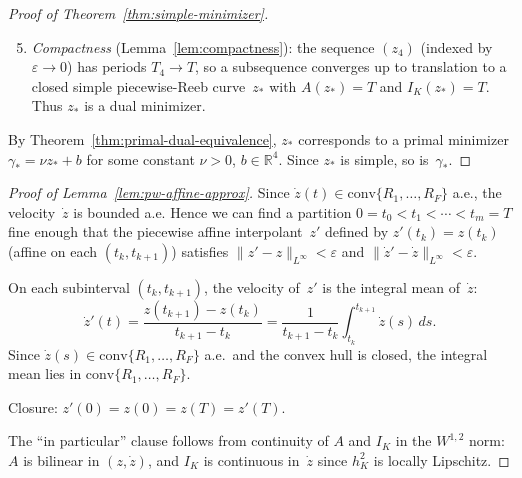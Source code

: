 \begin{proof}[Proof of Theorem~\ref{thm:simple-minimizer}]
\begin{enumerate}\setcounter{enumi}{4}
\item \emph{Compactness}
  (Lemma~\ref{lem:compactness}):
  the sequence $(z_4)$ (indexed by $\varepsilon \to 0$)
  has periods $T_4 \to T$, so a subsequence converges up to translation
  to a closed simple piecewise-Reeb
  curve~$z_*$ with
  $A(z_*) = T$ and $I_K(z_*) = T$.
  Thus $z_*$ is a dual minimizer.
\end{enumerate}

By Theorem~\ref{thm:primal-dual-equivalence},
$z_*$ corresponds to a primal minimizer
$\gamma_* = \nu z_* + b$ for some constant
$\nu > 0$, $b \in \mathbb{R}^4$.
Since $z_*$ is simple, so is~$\gamma_*$.
\end{proof}


\begin{proof}[Proof of Lemma~\ref{lem:pw-affine-approx}]
Since $\dot{z}(t) \in \mathrm{conv}\{R_1, \ldots, R_F\}$ a.e.,
the velocity~$\dot{z}$ is bounded a.e.
Hence we can find a partition $0 = t_0 < t_1 < \cdots < t_m = T$
fine enough that the piecewise affine interpolant~$z'$
defined by $z'(t_k) = z(t_k)$ (affine on each
$(t_k, t_{k+1})$) satisfies
$\|z' - z\|_{L^\infty} < \varepsilon$ and
$\|\dot{z}' - \dot{z}\|_{L^\infty} < \varepsilon$.

On each subinterval $(t_k, t_{k+1})$, the velocity
of~$z'$ is the integral mean of~$\dot{z}$:
\[
  \dot{z}'(t)
  = \frac{z(t_{k+1}) - z(t_k)}{t_{k+1} - t_k}
  = \frac{1}{t_{k+1} - t_k}
    \int_{t_k}^{t_{k+1}} \dot{z}(s)\, ds.
\]
Since $\dot{z}(s) \in \mathrm{conv}\{R_1, \ldots, R_F\}$
a.e.\ and the convex hull is closed, the integral mean
lies in $\mathrm{conv}\{R_1, \ldots, R_F\}$.

Closure: $z'(0) = z(0) = z(T) = z'(T)$.

The ``in particular'' clause follows from
continuity of $A$ and $I_K$ in the $W^{1,2}$ norm:
$A$ is bilinear in $(z, \dot{z})$, and
$I_K$ is continuous in~$\dot{z}$ since $h_K^2$ is
locally Lipschitz.
\end{proof}

